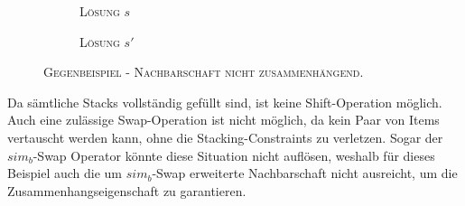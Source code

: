 \begin{figure}[H]
  \begin{subfigure}[b]{0.5\textwidth}
  \centering
    \caption{\textsc{Lösung $s$}}
    \label{fig:c_2_a}
  \end{subfigure}
  \hfill
  \begin{subfigure}[b]{0.5\textwidth}
  \centering
    \caption{\textsc{Lösung $s'$}}
    \label{fig:c_2_b}
  \end{subfigure}
  \caption{\textsc{Gegenbeispiel - Nachbarschaft nicht zusammenhängend.}}
  \label{fig:c_2_stacks}
\end{figure}

Da sämtliche Stacks vollständig gefüllt sind, ist keine Shift-Operation möglich.
Auch eine zulässige Swap-Operation ist nicht möglich, da kein Paar von Items vertauscht werden kann, ohne die
Stacking-Constraints zu verletzen. Sogar der $sim_b$-Swap Operator könnte diese Situation nicht auflösen,
weshalb für dieses Beispiel auch die um $sim_b$-Swap erweiterte Nachbarschaft nicht ausreicht,
um die Zusammenhangseigenschaft zu garantieren.

\vfill
\pagebreak

